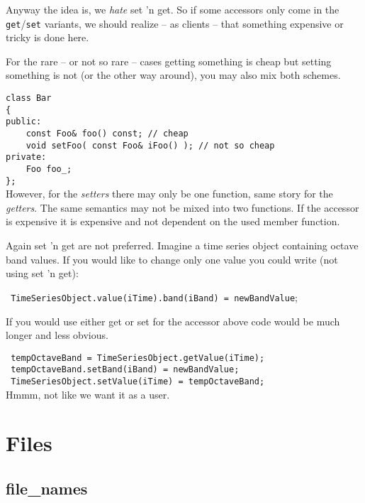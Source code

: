 \documentclass[10pt,a4paper,titlepage,dutch]{report}
\begin{document}
Anyway the idea is, we \emph{hate} set 'n get. So if some accessors
only come in the \verb|get|/\verb|set| variants, we should realize
-- as clients -- that something expensive or tricky is done here.

For the rare -- or not so rare -- cases getting something is cheap
but setting something is not (or the other way around), you may
also mix both schemes.

\verb|class Bar|\\
\verb|{|\\
\verb|public:|\\
\verb|    const Foo& foo() const; // cheap|\\
\verb|    void setFoo( const Foo& iFoo() ); // not so cheap|\\
\verb|private:|\\
\verb|    Foo foo_;|\\
\verb|};|\\

However, for the \emph{setters} there may only be one function, same story for
the \emph{getters}.  The same semantics may not be mixed into two
functions.  If the accessor is expensive it is expensive and not
dependent on the used member function.

Again set 'n get are not preferred.  Imagine a time series object
containing octave band values.  If you would like to change only
one value you could write (not using set 'n get):

\verb| TimeSeriesObject.value(iTime).band(iBand) = newBandValue|;

If you would use either get or set for the accessor above code
would be much longer and less obvious.

\verb| tempOctaveBand = TimeSeriesObject.getValue(iTime);|\\
\verb| tempOctaveBand.setBand(iBand) = newBandValue;|\\
\verb| TimeSeriesObject.setValue(iTime) = tempOctaveBand;|\\

Hmmm, not like we want it as a user.




\chapter{Files}

\section{file\_names}
\end{document}
